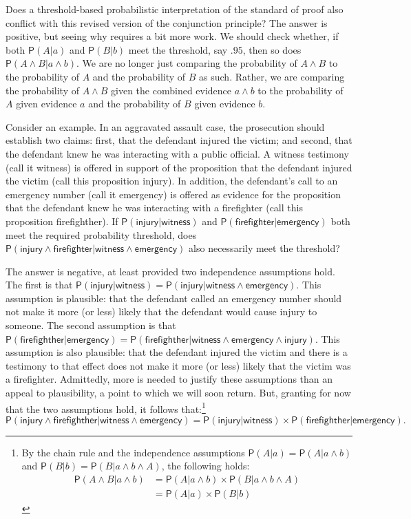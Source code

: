 \documentclass[
  10pt,
  dvipsnames,enabledeprecatedfontcommands]{scrartcl}
\newcommand{\pr}[1]{\ensuremath{\mathsf{P}(#1)}}
\begin{document}
Does a threshold-based probabilistic interpretation of the standard of
proof also conflict with this revised version of the conjunction
principle? The answer is positive, but seeing why requires a bit more
work. We should check whether, if both \(\pr{A \vert a}\) and
\(\pr{B \vert b}\) meet the threshold, say \(.95\), then so does
\(\pr{A\wedge B \vert a\wedge b}\). We are no longer just comparing the
probability of \(A\wedge B\) to the probability of \(A\) and the
probability of \(B\) as such. Rather, we are comparing the probability
of \(A \wedge B\) given the combined evidence \(a \wedge b\) to the
probability of \(A\) given evidence \(a\) and the probability of \(B\)
given evidence \(b\).

Consider an example. In an aggravated assault case, the prosecution
should establish two claims: first, that the defendant injured the
victim; and second, that the defendant knew he was interacting with a
public official. A witness testimony (call it \textsf{witness}) is
offered in support of the proposition that the defendant injured the
victim (call this proposition \textsf{injury}). In addition, the
defendant's call to an emergency number (call it \textsf{emergency}) is
offered as evidence for the proposition that the defendant knew he was
interacting with a firefighter (call this proposition
\textsf{firefighther}). If
\(\pr{\textsf{injury} \vert \textsf{witness}}\) and
\(\pr{\textsf{firefighter} \vert \textsf{emergency} }\) both meet the
required probability threshold, does
\(\pr{\textsf{injury} \wedge \textsf{firefighter} \vert \textsf{witness} \wedge \textsf{emergency}}\)
also necessarily meet the threshold?

The answer is negative, at least provided two independence assumptions
hold. The first is that
\(\pr{\textsf{injury} \vert \textsf{witness}}=\pr{\textsf{injury} \vert \textsf{witness} \wedge \textsf{emergency}}\).
This assumption is plausible: that the defendant called an emergency
number should not make it more (or less) likely that the defendant would
cause injury to someone. The second assumption is that
\(\pr{\textsf{firefighther} \vert \textsf{emergency} }=\pr{\textsf{firefighther} \vert \textsf{witness} \wedge \textsf{emergency} \wedge \textsf{injury}}\).
This assumption is also plausible: that the defendant injured the victim
and there is a testimony to that effect does not make it more (or less)
likely that the victim was a firefighter. Admittedly, more is needed to
justify these assumptions than an appeal to plausibility, a point to
which we will soon return. But, granting for now that the two
assumptions hold, it follows that:\footnote{By the chain rule and the
  independence assumptions \(\pr{A | a}=\pr{A | a \wedge b}\) and
  \(\pr{B | b}=\pr{B | a \wedge b \wedge A}\), the following holds:
  \begin{align*}
  \pr{A \wedge  B \vert a \wedge b}& =\pr{A \vert a \wedge b} \times \pr{B \vert  a \wedge b \wedge A}\\
   & = \pr{A \vert a} \times \pr{B \vert  b}
   \end{align*}}
\[\pr{\textsf{injury} \wedge \textsf{firefighther} \vert \textsf{witness} \wedge \textsf{emergency}}= \pr{\textsf{injury} \vert \textsf{witness}} \times \pr{\textsf{firefighther} \vert \textsf{emergency}}. \]
\end{document}
